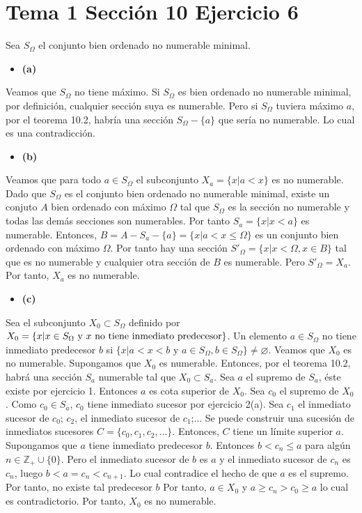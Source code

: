 \documentclass{article}
\begin{document}
\section{Tema 1 Sección 10 Ejercicio 6}
Sea $S_{\Omega}$ el conjunto bien ordenado no numerable minimal.
\begin{itemize}
\item \bf (a)\rm
\end{itemize}
Veamos que $S_{\Omega}$ no tiene máximo. Si $S_{\Omega}$ es bien ordenado no numerable minimal, por definición, cualquier sección suya es numerable. Pero si $S_{\Omega}$ tuviera máximo $a$, por el teorema 10.2, habría una sección $S_{\Omega}-\{a\}$ que sería no numerable. Lo cual es una contradicción.
\begin{itemize}
\item \bf (b)\rm
\end{itemize}
Veamos que para todo  $a\in S_{\Omega}$ el subconjunto $X_a=\{x|a<x\}$ es no numerable. Dado que $S_\Omega$ es el conjunto bien ordenado no numerable minimal, existe un conjuto $A$ bien ordenado con máximo $\Omega$ tal que $S_{\Omega}$ es la sección no numerable y todas las demás secciones son numerables. Por tanto $S_a=\{x|x<a\}$ es numerable. Entonces, $B=A-S_a-\{a\}=\{x|a< x\leq \Omega\}$ es un conjunto bien ordenado con máximo $\Omega$. Por tanto hay una sección $S'_\Omega=\{x|x<\Omega, x\in B\}$ tal que es no numerable y cualquier otra sección de $B$ es numerable. Pero $S'_\Omega=X_a$. Por tanto, $X_a$ es no numerable. 
\begin{itemize}
\item \bf (c)\rm
\end{itemize}
Sea el subconjunto $X_0\subset S_{\Omega}$ definido por $X_0=\{x|x\in S_{\Omega}\text{ y } x \\\text{ no tiene inmediato predecesor} \}$. Un elemento $a\in S_{\Omega}$ no tiene inmediato predecesor $b$ si $\{x|a <x<b\text{ y }a\in S_{\Omega}, b\in S_{\Omega}\}\neq \varnothing $. Veamos que $X_0$ es no numerable. Supongamos que $X_0$ es numerable. Entonces, por el teorema 10.2, habrá una sección $S_a$ numerable tal que $X_0\subset S_a$. Sea $a$ el supremo de $S_a$, éste existe por ejercicio 1. Entonces $a$ es cota superior de $X_0$. Sea $c_0$ el supremo de $X_0$. Como $c_0\in S_{a}$, $c_0$ tiene inmediato sucesor por ejercicio 2(a). Sea $c_1$ el inmediato sucesor de $c_0$; $c_2$, el inmediato sucesor de $c_1$;... Se puede construir una sucesión de inmediatos sucesores $C=\{c_0,c_1,c_2,...\}$. Entonces, $C$ tiene un límite superior $a$. Supongamos que $a$ tiene inmediato predecesor $b$. Entonces $b<c_n\leq a$ para algún $n\in \mathbb{Z}_{+}\cup\{0\}$. Pero el inmediato sucesor de $b$ es $a$ y el inmediato sucesor de $c_n$ es $c_n$, luego $b<a=c_n<c_{n+1}$. Lo cual contradice el hecho de que $a$ es el supremo. Por tanto, no existe tal predecesor $b$  Por tanto, $a\in X_0$ y $a\geq c_n> c_0\geq a$ lo cual es contradictorio. Por tanto, $X_0$ es no numerable.
\end{document}
